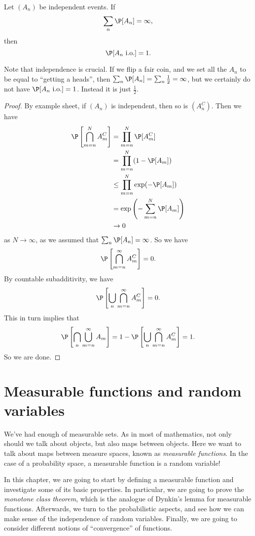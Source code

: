\documentclass[a4paper]{article}
\begin{document}
\begin{lemma}
  Let $(A_n)$ be independent events. If
  \[
    \sum_n \P[A_n] = \infty,
  \]
  then
  \[
    \P[A_n\text{ i.o.}] = 1.
  \]
\end{lemma}
Note that independence is crucial. If we flip a fair coin, and we set all the $A_n$ to be equal to ``getting a heads'', then $\sum_n \P[A_n] = \sum_n \frac{1}{2} = \infty$, but we certainly do not have $\P[A_n\text{ i.o.}] = 1$. Instead it is just $\frac{1}{2}$.

\begin{proof}
  By example sheet, if $(A_n)$ is independent, then so is $(A_n^C)$. Then we have
  \begin{align*}
    \P\left[\bigcap_{m = n}^N A_m^C\right] &= \prod_{m = n}^N \P[A_m^C]\\
    &= \prod_{m = n}^N (1 - \P[A_m])\\
    &\leq \prod_{m = n}^N \exp(-\P[A_m])\\
    &= \exp\left(- \sum_{m = n}^N \P[A_m]\right)\\
    &\to 0
  \end{align*}
  as $N \to \infty$, as we assumed that $\sum_n \P[A_n] = \infty$. So we have
  \[
    \P\left[\bigcap_{m = n}^\infty A_m^C\right] = 0.
  \]
  By countable subadditivity, we have
  \[
    \P\left[\bigcup_n \bigcap_{m = n}^\infty A_m^C\right] = 0.
  \]
  This in turn implies that
  \[
    \P\left[\bigcap_n \bigcup_{m = n}^\infty A_m\right] = 1 - \P\left[\bigcup_n \bigcap_{m = n}^\infty A_m^C\right] = 1.
  \]
  So we are done.
\end{proof}

\section{Measurable functions and random variables}
We've had enough of measurable sets. As in most of mathematics, not only should we talk about objects, but also maps between objects. Here we want to talk about maps between measure spaces, known as \emph{measurable functions}. In the case of a probability space, a measurable function is a random variable!

In this chapter, we are going to start by defining a measurable function and investigate some of its basic properties. In particular, we are going to prove the \emph{monotone class theorem}, which is the analogue of Dynkin's lemma for measurable functions. Afterwards, we turn to the probabilistic aspects, and see how we can make sense of the independence of random variables. Finally, we are going to consider different notions of ``convergence'' of functions.
\end{document}
